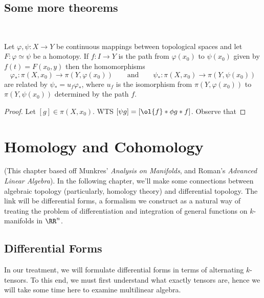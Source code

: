 \documentclass{fkbook}
\theoremstyle{snazzydefinition}
\begin{document}
\begin{adjustwidth}{1em}{}
  \section*{Some more theorems}~
  \begin{theorem}
    Let $\varphi, \psi : X \to Y$ be continuous mappings between
    topological spaces and let $F : \varphi \simeq \psi$ be a
    homotopy. If $f : I \to Y$ is the path from $\varphi(x_0)$ to
    $\psi(x_0)$ given by $f(t) = F(x_0, y)$ then the homomorphisms
    \[
      \varphi_* : \pi(X, x_0) \to \pi(Y, \varphi(x_0)) \qquad
      \text{and} \qquad \psi_* : \pi(X,x_0) \to \pi(Y, \psi(x_0))
    \]
    are related by $\psi_* = u_f \varphi_*$, where $u_f$ is the
    isomorphism from $\pi(Y, \varphi(x_0))$ to $\pi(Y, \psi(x_0))$
    determined by the path $f$.
  \end{theorem}
  \begin{proof}
    Let $[g] \in \pi(X, x_0)$. WTS $[\psi g] = [\ol{f} * \phi g * f]$.
    Observe that
  \end{proof}
\end{adjustwidth}

\chapter{Homology and Cohomology}
(This chapter based off Munkres' \emph{Analysis on Manifolds}, and
Roman's \emph{Advanced Linear Algebra}). In the following chapter,
we'll make some connections between algebraic topology (particularly,
homology theory) and differential topology. The link will be
differential forms, a formalism we construct as a natural way of
treating the problem of differentiation and integration of general
functions on $k$-manifolds in $\RR^n$.
\section{Differential Forms}
In our treatment, we will formulate differential forms in terms of
alternating $k$-tensors. To this end, we must first understand what
exactly tensors are, hence we will take some time here to examine
multilinear algebra.
\end{document}
